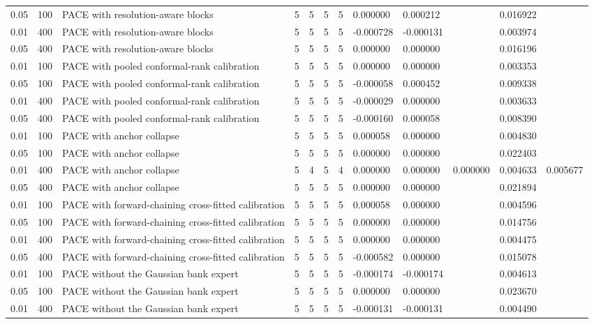 \begin{tabular}{llllllllllll}
0.05 & 100 & PACE with resolution-aware blocks & 5 & 5 & 5 & 5 & 0.000000 & 0.000212 &  & 0.016922 &  \\
0.01 & 400 & PACE with resolution-aware blocks & 5 & 5 & 5 & 5 & -0.000728 & -0.000131 &  & 0.003974 &  \\
0.05 & 400 & PACE with resolution-aware blocks & 5 & 5 & 5 & 5 & 0.000000 & 0.000000 &  & 0.016196 &  \\
0.01 & 100 & PACE with pooled conformal-rank calibration & 5 & 5 & 5 & 5 & 0.000000 & 0.000000 &  & 0.003353 &  \\
0.05 & 100 & PACE with pooled conformal-rank calibration & 5 & 5 & 5 & 5 & -0.000058 & 0.000452 &  & 0.009338 &  \\
0.01 & 400 & PACE with pooled conformal-rank calibration & 5 & 5 & 5 & 5 & -0.000029 & 0.000000 &  & 0.003633 &  \\
0.05 & 400 & PACE with pooled conformal-rank calibration & 5 & 5 & 5 & 5 & -0.000160 & 0.000058 &  & 0.008390 &  \\
0.01 & 100 & PACE with anchor collapse & 5 & 5 & 5 & 5 & 0.000058 & 0.000000 &  & 0.004830 &  \\
0.05 & 100 & PACE with anchor collapse & 5 & 5 & 5 & 5 & 0.000000 & 0.000000 &  & 0.022403 &  \\
0.01 & 400 & PACE with anchor collapse & 5 & 4 & 5 & 4 & 0.000000 & 0.000000 & 0.000000 & 0.004633 & 0.005677 \\
0.05 & 400 & PACE with anchor collapse & 5 & 5 & 5 & 5 & 0.000000 & 0.000000 &  & 0.021894 &  \\
0.01 & 100 & PACE with forward-chaining cross-fitted calibration & 5 & 5 & 5 & 5 & 0.000058 & 0.000000 &  & 0.004596 &  \\
0.05 & 100 & PACE with forward-chaining cross-fitted calibration & 5 & 5 & 5 & 5 & 0.000000 & 0.000000 &  & 0.014756 &  \\
0.01 & 400 & PACE with forward-chaining cross-fitted calibration & 5 & 5 & 5 & 5 & 0.000000 & 0.000000 &  & 0.004475 &  \\
0.05 & 400 & PACE with forward-chaining cross-fitted calibration & 5 & 5 & 5 & 5 & -0.000582 & 0.000000 &  & 0.015078 &  \\
0.01 & 100 & PACE without the Gaussian bank expert & 5 & 5 & 5 & 5 & -0.000174 & -0.000174 &  & 0.004613 &  \\
0.05 & 100 & PACE without the Gaussian bank expert & 5 & 5 & 5 & 5 & 0.000000 & 0.000000 &  & 0.023670 &  \\
0.01 & 400 & PACE without the Gaussian bank expert & 5 & 5 & 5 & 5 & -0.000131 & -0.000131 &  & 0.004490 &  \\

\end{tabular}
